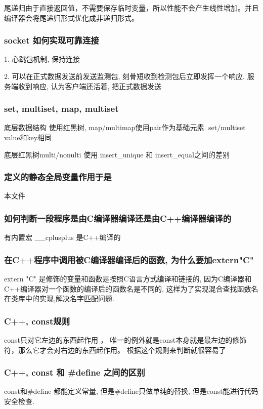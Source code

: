 尾递归由于直接返回值，不需要保存临时变量，所以性能不会产生线性增加。并且编译器会将尾递归形式优化成非递归形式。


\subsubsection{socket 如何实现可靠连接}
1. 心跳包机制, 保持连接

2. 可以在正式数据发送前发送监测包, 刻骨短收到检测包后立即发挥一个响应. 服务端收到响应, 认为客户端还活着, 把正式数据发送


\subsubsection{set, multiset, map, multiset}
底层数据结构 使用红黑树, map/multimap使用pair作为基础元素. set/multiset value和key相同 \par
底层红黑树multi/nonulti 使用 insert\_unique 和 insert\_equal之间的差别 \par
\subsubsection{定义的静态全局变量作用于是}
本文件
\subsubsection{如何判断一段程序是由C编译器编译还是由C++编译器编译的}
有内置宏 \_\_cplusplus 是C++编译的
\subsubsection{在C++程序中调用被C编译器编译后的函数, 为什么要加extern"C"}
extern "C" 是修饰的变量和函数是按照C语言方式编译和链接的, 因为C编译器和C++编译器对一个函数的编译后的函数名是不同的, 这样为了实现混合查找函数名在类库中的实现,解决名字匹配问题. \par

\subsubsection{C++, const规则}
const只对它左边的东西起作用 ，  唯一的例外就是const本身就是最左边的修饰符，那么它才会对右边的东西起作用。 根据这个规则来判断就很容易了
\subsubsection{C++, const 和 \#define 之间的区别}
const和\#define 都能定义常量, 但是\#define只做单纯的替换, 但是const能进行代码安全检查.
